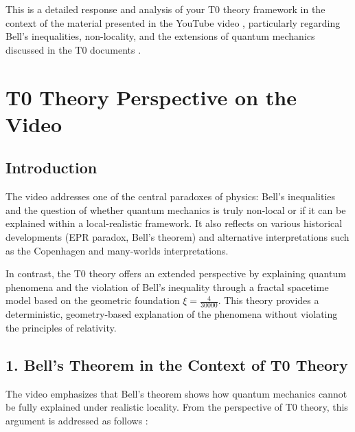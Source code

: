 This is a detailed response and analysis of your T0 theory framework in the context of the material presented in the YouTube video \cite{VideoBell2024}, particularly regarding Bell's inequalities, non-locality, and the extensions of quantum mechanics discussed in the T0 documents \cite{Bell_En, DynMassePhotonenNichtlokalEn, NoGoEn, 023_Bell_En_ch, 131_scheinbar_instantan_En}.
	
	\section*{T0 Theory Perspective on the Video}
	
	\subsection*{Introduction}
	
	The video \cite{VideoBell2024} addresses one of the central paradoxes of physics: Bell's inequalities and the question of whether quantum mechanics is truly non-local or if it can be explained within a local-realistic framework. It also reflects on various historical developments (EPR paradox, Bell's theorem) and alternative interpretations such as the Copenhagen and many-worlds interpretations.
	
	In contrast, the T0 theory offers an extended perspective by explaining quantum phenomena and the violation of Bell's inequality through a fractal spacetime model based on the geometric foundation $\xi = \frac{4}{30000}$. This theory provides a deterministic, geometry-based explanation of the phenomena without violating the principles of relativity.
	
	\subsection*{1. Bell's Theorem in the Context of T0 Theory}
	
	The video emphasizes that Bell's theorem shows how quantum mechanics cannot be fully explained under realistic locality. From the perspective of T0 theory, this argument is addressed as follows \cite{Bell_En, NoGoEn, 023_Bell_En_ch}:
	
